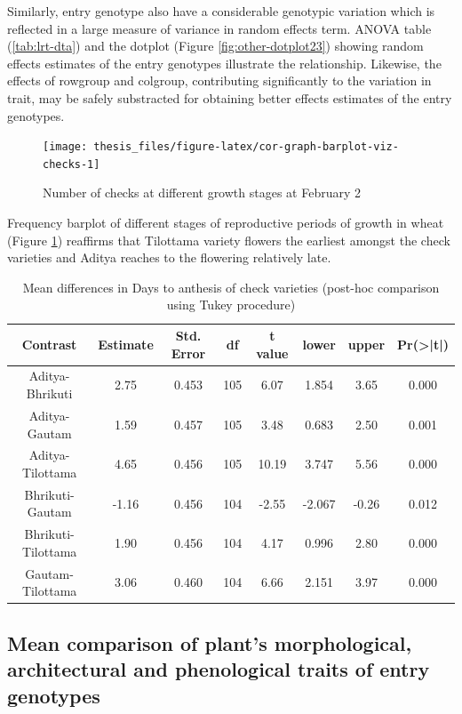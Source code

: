 \documentclass[12pt,oneside]{dukestatscithesis} %
\begin{document}
Similarly, entry genotype also have a considerable genotypic variation which is reflected in a large measure of variance in random effects term. ANOVA table (\ref{tab:lrt-dta}) and the dotplot (Figure \ref{fig:other-dotplot23}) showing random effects estimates of the entry genotypes illustrate the relationship. Likewise, the effects of rowgroup and colgroup, contributing significantly to the variation in trait, may be safely substracted for obtaining better effects estimates of the entry genotypes.
\begin{figure}[H]

{\centering \texttt{[image: thesis\_files/figure-latex/cor-graph-barplot-viz-checks-1]} 

}

\caption{Number of checks at different growth stages at February 2}\label{fig:cor-graph-barplot-viz-checks}
\end{figure}
Frequency barplot of different stages of reproductive periods of growth in wheat (Figure \ref{fig:cor-graph-barplot-viz-checks}) reaffirms that Tilottama variety flowers the earliest amongst the check varieties and Aditya reaches to the flowering relatively late.
\begin{table}[H]

\caption{\label{tab:other-meanconf-tab7}Mean differences in Days to anthesis of check varieties (post-hoc comparison using Tukey procedure)}
\centering
\begin{tabular}[t]{cccccccc}
\toprule
Contrast & Estimate & Std. Error & df & t value & lower & upper & Pr(>|t|)\\
\midrule
Aditya-Bhrikuti & 2.75 & 0.453 & 105 & 6.07 & 1.854 & 3.65 & 0.000\\
Aditya-Gautam & 1.59 & 0.457 & 105 & 3.48 & 0.683 & 2.50 & 0.001\\
Aditya-Tilottama & 4.65 & 0.456 & 105 & 10.19 & 3.747 & 5.56 & 0.000\\
Bhrikuti-Gautam & -1.16 & 0.456 & 104 & -2.55 & -2.067 & -0.26 & 0.012\\
Bhrikuti-Tilottama & 1.90 & 0.456 & 104 & 4.17 & 0.996 & 2.80 & 0.000\\
Gautam-Tilottama & 3.06 & 0.460 & 104 & 6.66 & 2.151 & 3.97 & 0.000\\
\bottomrule
\end{tabular}
\end{table}
\hypertarget{mean-comparison-of-plants-morphological-architectural-and-phenological-traits-of-entry-genotypes}{%
\subsection{Mean comparison of plant's morphological, architectural and phenological traits of entry genotypes}\label{mean-comparison-of-plants-morphological-architectural-and-phenological-traits-of-entry-genotypes}}
\end{document}

